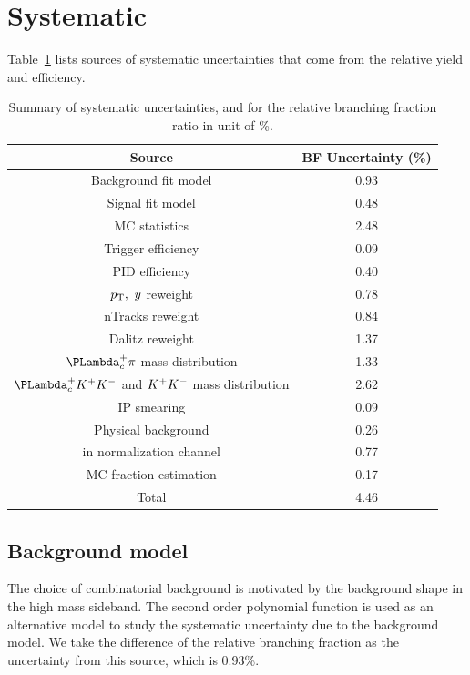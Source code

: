 
\section{Systematic}
\label{sec:systematic}

Table~\ref{tab:systemerr} lists sources of systematic uncertainties that come from the relative yield and efficiency.


\begin{table}[htp]
\centering
\caption{Summary of  systematic uncertainties, and for the relative branching fraction ratio in unit of \%.}
\label{tab:systemerr}
\begin{tabular}{c c }\hline\hline
	Source & BF Uncertainty (\%) \\ \hline
	Background fit model&  0.93 \\ \hline
	Signal fit model &  0.48  \\ \hline
	MC statistics  &  2.48  \\ \hline

	Trigger efficiency 		  & 0.09        \\ \hline
	PID efficiency 			  & 0.40   \\ \hline
	$p_{\mathrm{T}}, ~y$ reweight 		  & 0.78   \\ \hline
	nTracks reweight 		  & 0.84   \\ \hline
	Dalitz reweight 		  & 1.37   \\ \hline

	$\Lc\pi$ mass distribution 	  & 1.33   \\ \hline
	$\Lc\Kp\Km$ and ${{K}^+}{{K}^-}$ mass distribution & 2.62   \\ \hline
	\Lb IP smearing 		  & 0.09      \\ \hline
	Physical background 		  & 0.26   \\ \hline
	\LbLckkpi in normalization channel& 0.77   \\ \hline
	MC fraction estimation 		  & 0.17   \\ \hline

	Total& 4.46   \\ \hline \hline
\end{tabular}
\end{table}

\subsection{Background model}
The choice of combinatorial background is motivated by the background shape in the high mass sideband. 
The second order polynomial function is used as an alternative model to study the systematic uncertainty due to the background model. 
We take the difference of the relative branching fraction as the uncertainty from this source, which is 0.93\%. 


